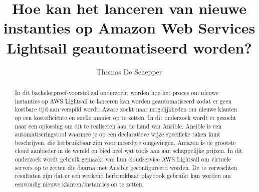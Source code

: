 \documentclass{hogent-article}
\title{Hoe kan het lanceren van nieuwe instanties op Amazon Web Services Lightsail geautomatiseerd worden?}
\author{Thomas De Schepper}
\begin{document}
\begin{abstract}
  {In dit bachelorproef-voorstel zal onderzocht worden hoe het proces om nieuwe instanties op AWS Lightsail 
  te lanceren kan worden geautomatiseerd zodat er geen kostbare tijd aan verspild wordt. 
  Aware zoekt naar mogelijkheden om nieuwe klanten op een kostefficiënte en snelle manier op te zetten. In dit onderzoek wordt er 
  gezocht naar een oplossing om dit te realiseren aan de hand van Ansible. Ansible is een automatiseringstool waarmee je op 
  een declaratieve wijze specifieke taken kunt beschrijven, die herbruikbaar zijn voor meerdere omgevingen.
  Amazon is de grootste cloud aanbieder in de wereld en bied heel wat tools aan aan schappelijke prijzen. 
  In dit onderzoek wordt gebruik gemaakt van hun cloudservice AWS Lightsail om virtuele servers op te zetten die daarna met Ansible 
  geconfigureerd worden. De te verwachten resultaten zijn dat er een werkend herbruikbaar playbook gebruikt kan worden om eenvoudig 
  nieuwe klanten/instanties op te zetten.}
\end{abstract}

\tableofcontents



\printbibliography[heading=bibintoc]
\end{document}
